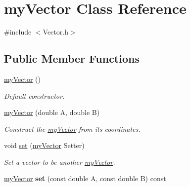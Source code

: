 \hypertarget{classmy_vector}{}\section{my\+Vector Class Reference}
\label{classmy_vector}


{\ttfamily \#include $<$Vector.\+h$>$}

\subsection*{Public Member Functions}
\begin{DoxyCompactItemize}
\item 
\hyperlink{classmy_vector_ae1bc15cce3be9c327b52f02da1c24503}{my\+Vector} ()
\begin{DoxyCompactList}\small\item\em Default constructor. \end{DoxyCompactList}\item 
\hyperlink{classmy_vector_a3c242231d09872ff18adcff8c5199dbd}{my\+Vector} (double A, double B)
\begin{DoxyCompactList}\small\item\em Construct the \hyperlink{classmy_vector}{my\+Vector} from its coordinates. \end{DoxyCompactList}\item 
void \hyperlink{classmy_vector_a14e8c2e0a550947a93cf178d50525a30}{set} (\hyperlink{classmy_vector}{my\+Vector} Setter)
\begin{DoxyCompactList}\small\item\em Set a vector to be another \hyperlink{classmy_vector}{my\+Vector}. \end{DoxyCompactList}\item 
\hypertarget{classmy_vector_a15d24fec4efc0a50a2648a7a54e79b4f}{}\hyperlink{classmy_vector}{my\+Vector} {\bfseries set} (const double A, const double B) const \label{classmy_vector_a15d24fec4efc0a50a2648a7a54e79b4f}


\end{DoxyCompactItemize}
